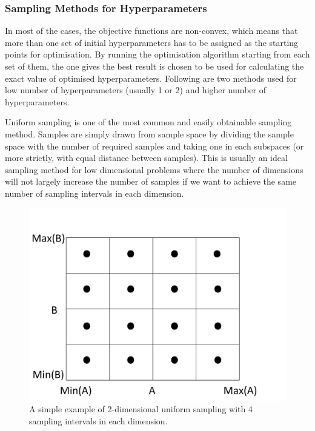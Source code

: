\documentclass[11pt]{report}
\numberwithin{equation}{chapter}
\begin{document}
\begin{spacing}{2}
\subsubsection{Sampling Methods for Hyperparameters}
In most of the cases, the objective functions are non-convex, which means that more than one set of initial hyperparameters has to be assigned as the starting points for optimisation. By running the optimisation algorithm starting from each set of them, the one gives the best result is chosen to be used for calculating the exact value of optimised hyperparameters. Following are two methods used for low number of hyperparameters (usually 1 or 2) and higher number of hyperparameters.


Uniform sampling is one of the most common and easily obtainable sampling method. Samples are simply drawn from sample space by dividing the sample space with the number of required samples and taking one in each subspaces (or more strictly, with equal distance between samples). This is usually an ideal sampling method for low dimensional problems where the number of dimensions will not largely increase the number of samples if we want to achieve the same number of sampling intervals in each dimension. 

\begin{figure}
\centering
\includegraphics[scale=0.3]{Uniform_sampling.pdf}
\caption{A simple example of 2-dimensional uniform sampling with 4 sampling intervals in each dimension.}
\end{figure}



\end{spacing}
\end{document}
